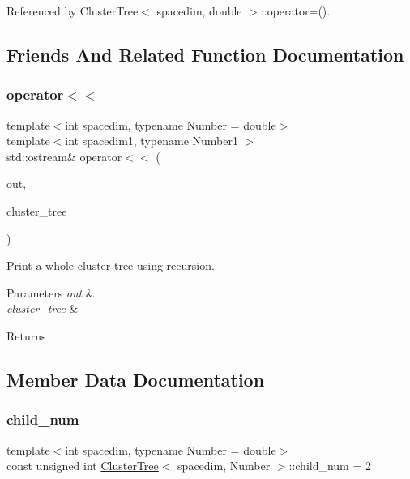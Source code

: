 Referenced by Cluster\+Tree$<$ spacedim, double $>$\+::operator=().



\subsection{Friends And Related Function Documentation}
\mbox{\label{classClusterTree_a67abb576193ee1ad87882a2b748df865}} 
\subsubsection{\texorpdfstring{operator$<$$<$}{operator<<}}
{\footnotesize\ttfamily template$<$int spacedim, typename Number = double$>$ \\
template$<$int spacedim1, typename Number1 $>$ \\
std\+::ostream\& operator$<$$<$ (\begin{DoxyParamCaption}\item[{std\+::ostream \&}]{out,  }\item[{const \hyperlink{classClusterTree}{Cluster\+Tree}$<$ spacedim1, Number1 $>$ \&}]{cluster\+\_\+tree }\end{DoxyParamCaption})\hspace{0.3cm}{\ttfamily [friend]}}

Print a whole cluster tree using recursion. 
\begin{DoxyParams}{Parameters}
{\em out} & \\
\hline
{\em cluster\+\_\+tree} & \\
\hline
\end{DoxyParams}
\begin{DoxyReturn}{Returns}

\end{DoxyReturn}


\subsection{Member Data Documentation}
\mbox{\label{classClusterTree_aa9705d3fecd5b405b804331ea031570c}} 
\subsubsection{\texorpdfstring{child\+\_\+num}{child\_num}}
{\footnotesize\ttfamily template$<$int spacedim, typename Number = double$>$ \\
const unsigned int \hyperlink{classClusterTree}{Cluster\+Tree}$<$ spacedim, Number $>$\+::child\+\_\+num = 2\hspace{0.3cm}{\ttfamily [static]}}

